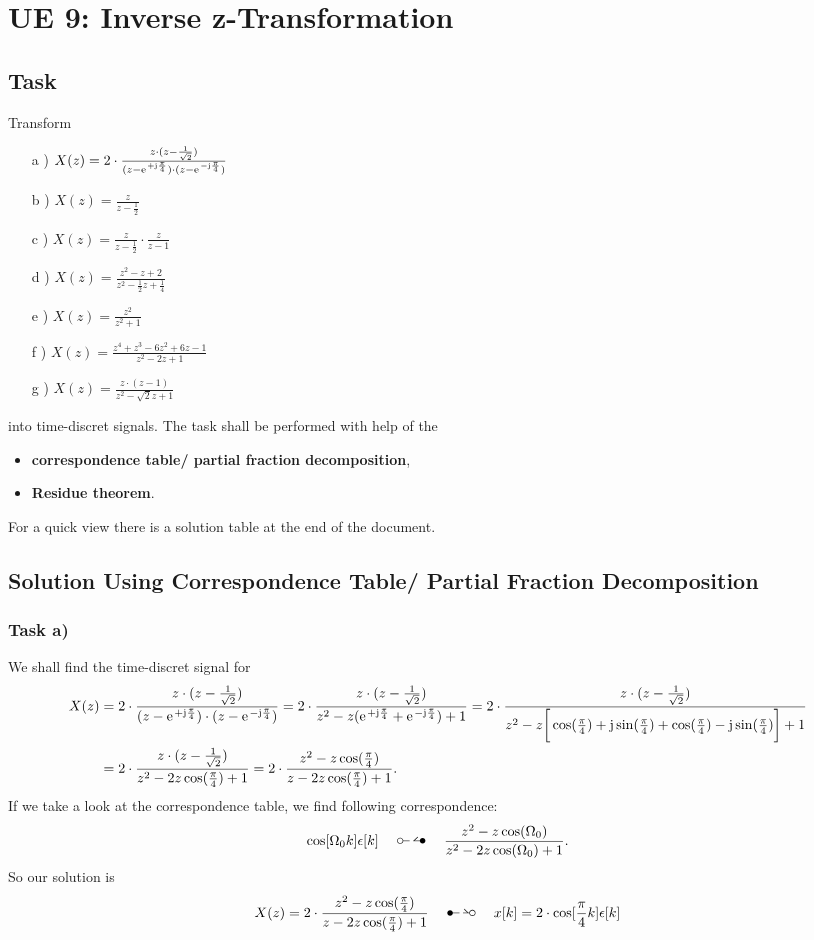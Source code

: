 \clearpage
\section{UE 9: Inverse z-Transformation}

\subsection{Task}
Transform
\begin{itemize}
	\item[a )] $X(z)=2\cdot\frac{z\cdot(z-\frac{1}{\sqrt{2}})}{(z-\e^{+\im\frac{\pi}{4}})\cdot(z-\e^{-\im\frac{\pi}{4}})}$
	\item[b )] $X(z)=\frac{z}{z-\frac{1}{2}}$
	\item[c )] $X(z)=\frac{z}{z-\frac{1}{2}}\cdot\frac{z}{z-1}$
	\item[d )] $X(z)=\frac{z^2-z+2}{z^2-\frac{1}{2}z+\frac{1}{4}}$
	\item[e )] $X(z)=\frac{z^2}{z^2+1}$
	\item[f )] $X(z)=\frac{z^4+z^3-6z^2+6z-1}{z^2-2z+1}$
	\item[g )] $X(z)=\frac{z\cdot(z-1)}{z^2-\sqrt{2}z+1}$
\end{itemize}
into time-discret signals.
The task shall be performed with help of the
\begin{itemize}
	\item \textbf{correspondence table/ partial fraction decomposition},
	\item \textbf{Residue theorem}.
\end{itemize}
For a quick view there is a solution table at the end of the document.
\subsection{Solution Using Correspondence Table/ Partial Fraction Decomposition}
\subsubsection{Task a)}
We shall find the time-discret signal for
\begin{align}
	X(z)&=2\cdot\frac{z\cdot(z-\frac{1}{\sqrt{2}})}{(z-\e^{+\im\frac{\pi}{4}})\cdot(z-\e^{-\im\frac{\pi}{4}})}=2\cdot\frac{z\cdot(z-\frac{1}{\sqrt{2}})}{z^2-z(\e^{+\im\frac{\pi}{4}}+\e^{-\im\frac{\pi}{4}})+1}=2\cdot\frac{z\cdot(z-\frac{1}{\sqrt{2}})}{z^2-z\bigg[\cos(\frac{\pi}{4})+\im\sin(\frac{\pi}{4})+\cos(\frac{\pi}{4})-\im\sin(\frac{\pi}{4})\bigg ]+1}\nonumber\\
	&=2\cdot\frac{z\cdot(z-\frac{1}{\sqrt{2}})}{z^2-2z\cos(\frac{\pi}{4})+1}=2\cdot\frac{z^2-z\cos(\frac{\pi}{4})}{z-2z\cos(\frac{\pi}{4})+1}.
\end{align}
If we take a look at the correspondence table, we find following correspondence:
\begin{align}
	\cos[\Omega_0k]\epsilon[k]\quad\ztransf\quad\frac{z^2-z\cos(\Omega_0)}{z^2-2z\cos(\Omega_0)+1}.
\end{align}
So our solution is
\begin{align}
	X(z)=2\cdot\frac{z^2-z\cos(\frac{\pi}{4})}{z-2z\cos(\frac{\pi}{4})+1}\quad\Ztransf\quad x[k]=2\cdot\cos[\frac{\pi}{4}k]\epsilon[k]
\end{align}
